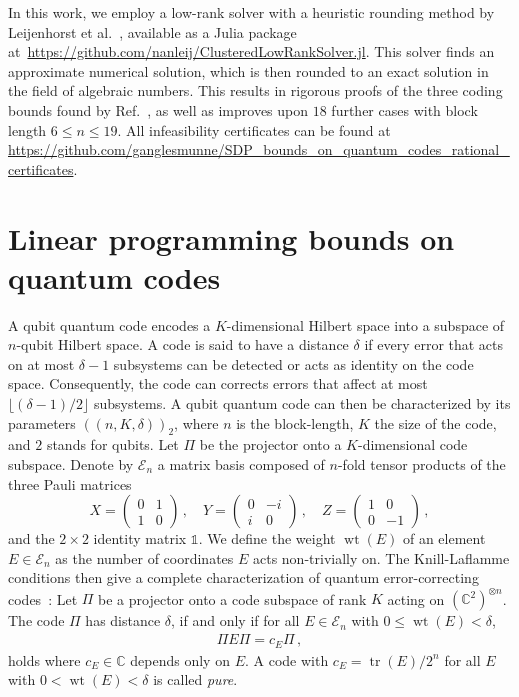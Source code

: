 \documentclass[12pt,a4paper]{amsart}
\DeclareMathOperator{\tr}{tr}
\DeclareMathOperator{\wt}{wt}
\newcommand{\ot}[0]{\otimes}
\newcommand{\one}[0]{\mathds{1}}
\newcommand{\C}{\mathds{C}}
\newcommand{\E}{\mathcal{E}}
\begin{document}
In this work, we employ a low-rank solver with a heuristic rounding method by Leijenhorst et al.~\cite{Leijenhorst_2024,cohn2024optimalitysphericalcodesexact}, 
available as a Julia package at~\url{https://github.com/nanleij/ClusteredLowRankSolver.jl}. This solver finds an approximate numerical solution, which is then rounded to an exact solution in the field of algebraic numbers. 
%
This results in rigorous proofs of the three coding bounds 
found by Ref.~\cite{munne2025sdpboundsquantumcodes}, 
as well as improves upon $18$ further cases 
with block length $6 \leq n \leq 19$. 
All infeasibility certificates can be found at \url{https://github.com/ganglesmunne/SDP_bounds_on_quantum_codes_rational_certificates}.

\section{Linear programming bounds on quantum codes}

A qubit quantum code encodes a $K$-dimensional Hilbert space into a subspace of $n$-qubit Hilbert space. 
% 
A code is said to have a distance $\delta$ if every
error that acts on at most $\delta-1$ subsystems can be detected or 
acts as identity on the code space.
% 
Consequently, the code can corrects errors that affect at most 
$\lfloor (\delta-1)/2 \rfloor$ subsystems.
% 
A qubit quantum code can then be characterized by its parameters $(\!(n,K,\delta)\!)_2$, 
where $n$ is the block-length, $K$ the size of the code, and $2$ stands for qubits.
% 
Let $\Pi$ be the projector onto a $K$-dimensional code subspace. Denote by $\E_n$ a matrix basis composed of $n$-fold tensor products of the three Pauli matrices 
\begin{equation}
    X = \begin{pmatrix}
        0 & 1 \\
        1 & 0
    \end{pmatrix}\,,\quad
   Y = \begin{pmatrix}
        0 & -i \\
        i & 0
    \end{pmatrix}\,,\quad
   Z = \begin{pmatrix}
        1 & 0 \\
        0 & -1
    \end{pmatrix}\,, 
\end{equation}
and the $2\times 2$ identity matrix $\one$. 
% 
We define the weight $\wt(E)$ of an element $E \in \E_n$ as the number of coordinates 
$E$ acts non-trivially on.
% 
The Knill-Laflamme conditions then give a complete characterization of quantum error-correcting codes~\cite{PhysRevA.55.900}: 
Let $\Pi$ be a projector onto a code subspace of rank $K$ acting on $(\C^2)^{\ot n}$.
The code $\Pi$ has distance $\delta$, if and only if
for all $E \in \E_n$ with $0\leq\wt(E)<\delta$, 
% 
\begin{align}
\Pi E \Pi = c_E\Pi\,,
\end{align}
holds where $c_E \in \C$ depends only on $E$. 
A code with $c_E = \tr(E)/2^n$ for all $E$ with 
$0 < \wt(E) < \delta$ is called {\em pure}.
\end{document}
